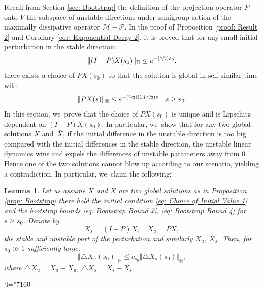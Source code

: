\documentclass[JEP,XML,SOM,Unicode]{cedram}
\newcommand{\Changel}{\mathcode`l="7160}
\newcommand{\Psfrac}[2]{(\sfrac{#1}{#2})}
\theoremstyle{plain}
\newtheorem{lemma}[proposition]{Lemma}
\theoremstyle{definition}
\begin{document}
Recall from Section \ref{sec: Bootstrap} the definition of the projection operator $P$ onto $V$ the subspace of unstable directions under semigroup action of the maximally dissipative operator $\mathcal M-\mathcal P$. In the proof of Proposition \ref{proof: Result 2} and Corollary \ref{cor: Exponential Decay 2}, it is proved that for any small initial perturbation in the stable direction:
\[
\Vert (I-P)X(s_0)\Vert_{\mathbb H}\le e^{-\Psfrac{\delta}{2}s_0},
\]
there exists a choice of $PX(s_0)$ so that the solution is global in self-similar time with
\[
\Vert PX(s)\Vert_{\mathbb H}\le e^{-\Psfrac{\delta}{2}(1+\sfrac{c}{2})s}\quad s\ge s_0.
\]
In this section, we~prove that the choice of $PX(s_0)$ is unique and is Lipschitz dependent on $(I-P)X(s_0)$. In particular, we~show that for any two global solutions $X$ and~$\bar X$, if the initial difference in the unstable direction is too big compared with the initial differences in the stable direction, the unstable linear dynamics wins and expels the differences of unstable parameters away from $0$. Hence one of the two solutions cannot blow up according to our scenario, yielding a contradiction. In particular, we~claim the following:

\begin{lemma}
\label{lem: Lipschitz}
Let us assume $X$ and $\bar X$ are two global solutions as in Proposition \ref{prop: Bootstrap} \ie there hold the initial condition \eqref{eq: Choice of Initial Value 1} and the bootstrap bounds \eqref{eq: Bootstrap Bound 2}, \eqref{eq: Bootstrap Bound 4} for $s\ge s_0$. Denote by
\[
X_s=(I-P)X,\quad X_u=PX,
\]
the stable and unstable part of the perturbation and similarly $\bar X_u$, $\bar X_s$. Then, for $s_0\gg1$ sufficiently large,
\begin{equation}
\label{eq: Lipschitz}
\Vert \triangle X_u(s_0)\Vert_{\mathbb H}\le c_{s_0} \Vert \triangle X_s(s_0)\Vert_{\mathbb H},
\end{equation}
where $\triangle X_u=X_u-\bar X_u$, $\triangle X_s=X_s-\bar X_s$.
\end{lemma}

\Changel
\end{document}
